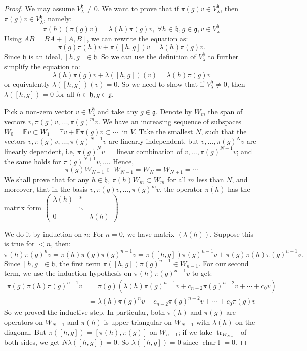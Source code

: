 \documentclass[10pt,twoside]{article}
\newcommand{\Ff}{\mathbb F}
\newcommand{\mg}{\mathfrak{g}}
\newcommand{\mh}{\mathfrak{h}}
\theoremstyle{definition}
\theoremstyle{remark}
\begin{document}
\begin{proof}
We may assume $V^{\mh}_\lambda \neq 0$.  We want to prove that if $\pi(g)v \in V^\mh_\lambda$, then $\pi(g)v\in V^\mh_\lambda$, namely:
$$\pi(h)(\pi(g)v)=\lambda(h)\pi(g)v, \; \forall h\in\mh, g\in\mg, v\in V^\mh_\lambda$$
Using $AB=BA+[A,B]$, we can rewrite the equation as: 
$$\pi(g)\pi(h)v+\pi([h,g])v=\lambda(h)\pi(g)v.$$
Since $\mh$ is an ideal, $[h,g]\in \mh$. So we can use the definition of $V^\mh_\lambda$ to further simplify the equation to:
$$\lambda(h)\pi(g)v+\lambda([h,g])(v)=\lambda(h)\pi(g)v$$
or equivalently $\lambda([h,g])(v)=0$.  So we need to show that if $V^\mh_\lambda \neq 0$, then $\lambda([h,g])=0$ for all $h\in\mh, g\in\mg$. 

Pick a non-zero vector $v\in V^\mh_\lambda$ and take any $g\in\mg$.  Denote by $W_m$ the span of vectors $v,\pi(g)v, \dotsc , \pi(g)^mv$.  We have an increasing sequence of subspaces $W_0=\Ff v\subset W_1=\Ff v+\Ff \pi(g)v \subset \dotsb \ $ in $V$.  Take the smallest $N$, such that the vectors $v, \pi(g)v, \dotsc, \pi(g)^{N-1}v$ are linearly independent, but $v,\dotsc, \pi(g)^Nv$ are linearly dependent, i.e, $\pi(g)^Nv=$ linear combination of $v,\dotsc, \pi(g)^{N-1}v$;  and the same holds for $\pi(g)^{N+1}v, \dotsc$.  Hence,
$$\pi(g)W_{N-1}\subset W_{N-1}=W_N=W_{N+1}=\dotsb$$
We shall prove that for any $h\in \mh$, $\pi(h)W_m\subset W_m$ for all $m$ less than $N$, and moreover, that in the basis $v,\pi(g)v, \dotsc, \pi(g)^mv$, the operator $\pi(h)$ has the matrix form
 $\begin{pmatrix}
\lambda(h) & * &  \\
           & \ddots &    \\
0 &   & \lambda(h) 
\end{pmatrix}$

We do it by induction on $n$: 
For $n=0$, we have matrix $(\lambda(h))$.  
Suppose this is true for $<n$, then: 
$$\pi(h)\pi(g)^{n}v=\pi(h)\pi(g)\pi(g)^{n-1}v=\pi([h,g])\pi(g)^{n-1}v+\pi(g)\pi(h)\pi(g)^{n-1}v.$$
Since $[h,g]\in \mh$, the first term $\pi([h,g])\pi(g)^{n-1} \in W_{n-1}$.  For our second term, we use the induction hypothesis on $\pi(h)\pi(g)^{n-1}v$ to get:
\begin{align*}
  \pi(g)\pi(h)\pi(g)^{n-1}v &= \pi(g)(\lambda(h)\pi(g)^{n-1}v+c_{n-2}\pi(g)^{n-2}v+\dotsb +c_0v) \\
                            &= \lambda(h)\pi(g)^{n}v+c_{n-2}\pi(g)^{n-2}v+\dotsb +c_0\pi(g)v
\end{align*}
So we proved the inductive step.  
In particular, both $\pi(h)$ and $\pi(g)$ are operators on $W_{N-1}$ and $\pi(h)$ is upper triangular on $W_{N-1}$ with $\lambda(h)$ on the diagonal.  But $\pi([h,g])=[\pi(h), \pi(g)]$ on $W_{n-1}$; if we take $\operatorname{tr}_{W_{N-1}}$ of both sides, we get $N\lambda([h,g])=0$.  So $\lambda([h,g])=0$ since $\operatorname{char}\Ff=0$.  

\end {proof}
\end{document}
